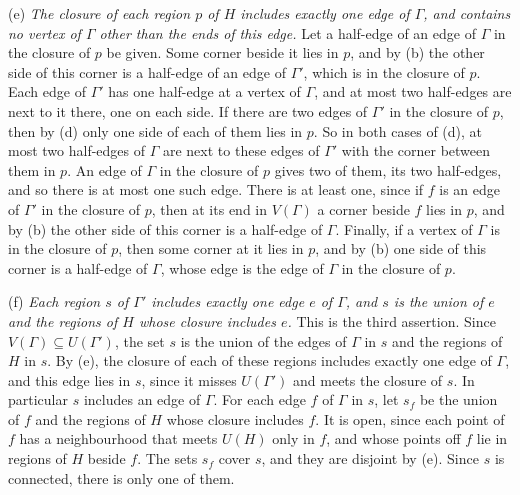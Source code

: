 {\hspace*{12pt}(e) \textit{The closure of each region $p$ of $H$ includes exactly one edge of $\Gamma$, and contains no vertex of $\Gamma$ other than the ends of this edge.} Let a half-edge of an edge of $\Gamma$ in the closure of $p$ be given. Some corner beside it lies in $p$, and by (b) the other side of this corner is a half-edge of an edge of $\Gamma'$, which is in the closure of $p$. Each edge of $\Gamma'$ has one half-edge at a vertex of $\Gamma$, and at most two half-edges are next to it there, one on each side. If there are two edges of $\Gamma'$ in the closure of $p$, then by (d) only one side of each of them lies in $p$. So in both cases of (d), at most two half-edges of $\Gamma$ are next to these edges of $\Gamma'$ with the corner between them in $p$. An edge of $\Gamma$ in the closure of $p$ gives two of them, its two half-edges, and so there is at most one such edge. There is at least one, since if $f$ is an edge of $\Gamma'$ in the closure of $p$, then at its end in $V(\Gamma)$ a corner beside $f$ lies in $p$, and by (b) the other side of this corner is a half-edge of $\Gamma$. Finally, if a vertex of $\Gamma$ is in the closure of $p$, then some corner at it lies in $p$, and by (b) one side of this corner is a half-edge of $\Gamma$, whose edge is the edge of $\Gamma$ in the closure of $p$.

\hspace*{12pt}(f) \textit{Each region $s$ of $\Gamma'$ includes exactly one edge $e$ of $\Gamma$, and $s$ is the union of $e$ and the regions of $H$ whose closure includes $e$.} This is the third assertion. Since $V(\Gamma) \subseteq U(\Gamma')$, the set $s$ is the union of the edges of $\Gamma$ in $s$ and the regions of $H$ in $s$. By (e), the closure of each of these regions includes exactly one edge of $\Gamma$, and this edge lies in $s$, since it misses $U(\Gamma')$ and meets the closure of $s$. In particular $s$ includes an edge of $\Gamma$. For each edge $f$ of $\Gamma$ in $s$, let $s_f$ be the union of $f$ and the regions of $H$ whose closure includes $f$. It is open, since each point of $f$ has a neighbourhood that meets $U(H)$ only in $f$, and whose points off $f$ lie in regions of $H$ beside $f$. The sets $s_f$ cover $s$, and they are disjoint by (e). Since $s$ is connected, there is only one of them.

}
